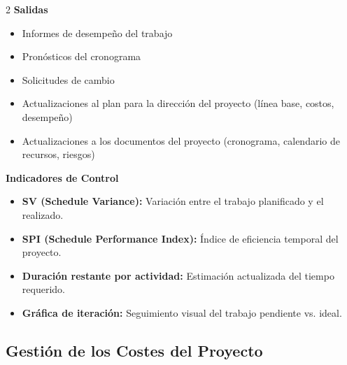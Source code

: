 \begin{multicols}{2}
    \textbf{Salidas}
    \begin{itemize}
        \item Informes de desempeño del trabajo
        \item Pronósticos del cronograma
        \item Solicitudes de cambio
        \item Actualizaciones al plan para la dirección del proyecto (línea base, costos, desempeño)
        \item Actualizaciones a los documentos del proyecto (cronograma, calendario de recursos, riesgos)
    \end{itemize}

    \textbf{Indicadores de Control}
    \begin{itemize}
        \item \textbf{SV (Schedule Variance):} Variación entre el trabajo planificado y el realizado.
        \item \textbf{SPI (Schedule Performance Index):} Índice de eficiencia temporal del proyecto.
        \item \textbf{Duración restante por actividad:} Estimación actualizada del tiempo requerido.
        \item \textbf{Gráfica de iteración:} Seguimiento visual del trabajo pendiente vs. ideal.
    \end{itemize}

    \end{multicols}

    \subsection{Gestión de los Costes del Proyecto}

